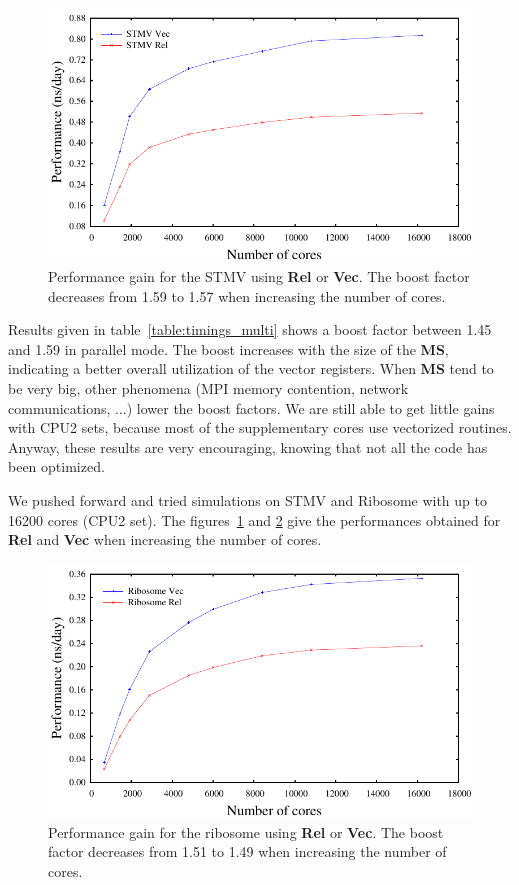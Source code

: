 \documentclass[9pt,comparison]{livecoms}
\begin{document}
\begin{figure}[h]
\centering
\includegraphics[scale=0.7]{stmv.pdf}
\caption{Performance gain for the STMV using \textbf{Rel} or \textbf{Vec}. The boost factor decreases from 1.59 to 1.57 when increasing the number of cores.}
\label{fig:stmv}
\end{figure}
Results given in table~\ref{table:timings_multi} shows a boost factor between 1.45 and 1.59 in parallel mode. The boost increases with the size of the \textbf{MS}, indicating a better overall utilization of the vector registers. When \textbf{MS} tend to be very big, other phenomena (MPI memory contention, network communications, ...) lower the boost factors. We are still able to get little gains with CPU2 sets, because most of the supplementary cores use vectorized routines. Anyway, these results are very encouraging, knowing that not all the code has been optimized.

We pushed forward and tried simulations on STMV and Ribosome with up to 16200 cores (CPU2 set). The figures~\ref{fig:stmv} and \ref{fig:ribosome} give the performances obtained for \textbf{Rel} and \textbf{Vec} when increasing the number of cores.

\begin{figure}[h]
\centering
\includegraphics[scale=0.7]{ribosome.pdf}
\caption{Performance gain for the ribosome using \textbf{Rel} or \textbf{Vec}. The boost factor decreases from 1.51 to 1.49 when increasing the number of cores.}
\label{fig:ribosome}
\end{figure}
\end{document}
